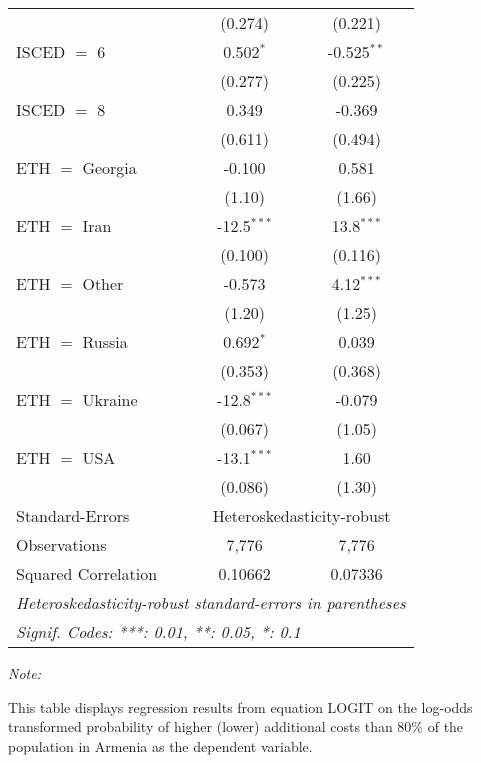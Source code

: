 \begin{table}[htbp!]
\begin{adjustbox}{width = 1\textwidth, max height = 0.95\textheight, center}
\begin{threeparttable}[b]
\begin{tabular}{lcc}
                                 & (0.274)        & (0.221)\\   
            ISCED $=$ 6          & 0.502$^{*}$    & -0.525$^{**}$\\   
                                 & (0.277)        & (0.225)\\   
            ISCED $=$ 8          & 0.349          & -0.369\\   
                                 & (0.611)        & (0.494)\\   
            ETH $=$ Georgia      & -0.100         & 0.581\\   
                                 & (1.10)         & (1.66)\\   
            ETH $=$ Iran         & -12.5$^{***}$  & 13.8$^{***}$\\   
                                 & (0.100)        & (0.116)\\   
            ETH $=$ Other        & -0.573         & 4.12$^{***}$\\   
                                 & (1.20)         & (1.25)\\   
            ETH $=$ Russia       & 0.692$^{*}$    & 0.039\\   
                                 & (0.353)        & (0.368)\\   
            ETH $=$ Ukraine      & -12.8$^{***}$  & -0.079\\   
                                 & (0.067)        & (1.05)\\   
            ETH $=$ USA          & -13.1$^{***}$  & 1.60\\   
                                 & (0.086)        & (1.30)\\   
            \midrule 
            Standard-Errors & \multicolumn{2}{c}{Heteroskedasticity-robust} \\ 
            Observations         & 7,776          & 7,776\\  
            Squared Correlation  & 0.10662        & 0.07336\\  
            \midrule \midrule
            \multicolumn{3}{l}{\emph{Heteroskedasticity-robust standard-errors in parentheses}}\\
            \multicolumn{3}{l}{\emph{Signif. Codes: ***: 0.01, **: 0.05, *: 0.1}}\\
         \end{tabular}
         
         \begin{tablenotes}\item \medskip \textit{Note:}
            \item This table displays regression results from equation LOGIT on the log-odds transformed probability of higher (lower) additional costs than 80\% of the population in Armenia as the dependent variable. 
         \end{tablenotes}
      \end{threeparttable}
   \end{adjustbox}
\end{table}


